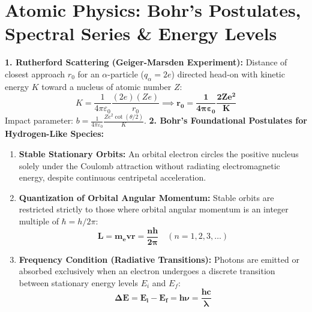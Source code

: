 \documentclass[10pt,a4paper]{article}
\begin{document}
\section{Atomic Physics: Bohr's Postulates, Spectral Series \& Energy Levels}

\begin{conceptbox}
\textbf{1. Rutherford Scattering (Geiger-Marsden Experiment):}
Distance of closest approach $r_0$ for an $\alpha$-particle ($q_\alpha = 2e$) directed head-on with kinetic energy $K$ toward a nucleus of atomic number $Z$:
\begin{equation}
  K = \frac{1}{4\pi\varepsilon_0}\frac{(2e)(Ze)}{r_0} \implies \mathbf{r_0 = \frac{1}{4\pi\varepsilon_0}\frac{2 Z e^2}{K}}
\end{equation}
Impact parameter: $b = \frac{1}{4\pi\varepsilon_0}\frac{Z e^2 \cot(\theta/2)}{K}$.
\textbf{2. Bohr's Foundational Postulates for Hydrogen-Like Species:}
\begin{enumerate}
  \item \textbf{Stable Stationary Orbits:} An orbital electron circles the positive nucleus solely under the Coulomb attraction without radiating electromagnetic energy, despite continuous centripetal acceleration.
  \item \textbf{Quantization of Orbital Angular Momentum:} Stable orbits are restricted strictly to those where orbital angular momentum is an integer multiple of $\hbar = h / 2\pi$:
  \begin{equation}
    \mathbf{L = m_e v r = \frac{n h}{2\pi}} \quad (n = 1, 2, 3, \dots)
  \end{equation}
  \item \textbf{Frequency Condition (Radiative Transitions):} Photons are emitted or absorbed exclusively when an electron undergoes a discrete transition between stationary energy levels $E_i$ and $E_f$:
  \begin{equation}
    \mathbf{\Delta E = E_i - E_f = h\nu = \frac{hc}{\lambda}}
  \end{equation}
\end{enumerate}
\end{conceptbox}
\end{document}

